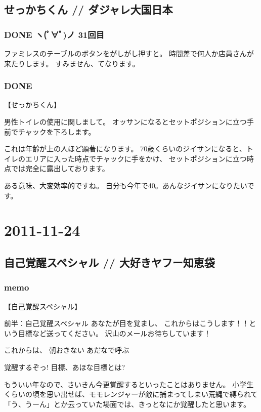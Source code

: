 \documentclass[11pt]{article}
\begin{document}
\subsection{せっかちくん // ダジャレ大国日本}
\label{sec-31_1}
\subsubsection{\textbf{DONE} ヽ(ﾟ∀ﾟ)ノ 31回目}
\label{sec-31_1_1}

ファミレスのテーブルのボタンをがしがし押すと。
時間差で何人か店員さんが来たりします。
すみません、てなります。
\subsubsection{\textbf{DONE}}
\label{sec-31_1_2}

【せっかちくん】

男性トイレの使用に関しまして。
オッサンになるとセットポジションに立つ手前でチャックを下ろします。

これは年齢が上の人ほど顕著になります。
70歳くらいのジイサンになると、トイレのエリアに入った時点でチャックに手をかけ、
セットポジションに立つ時点では完全に露出しております。

ある意味、大変効率的ですね。
自分も今年で40。あんなジイサンになりたいです。
\section{2011-11-24}
\label{sec-32}
\subsection{自己覚醒スペシャル // 大好きヤフー知恵袋}
\label{sec-32_1}
\subsubsection{memo}
\label{sec-32_1_1}

【自己覚醒スペシャル】

前半：自己覚醒スペシャル あなたが目を覚まし、 これからはこうします！！という目標など送ってください。 沢山のメールお待ちしています！

これからは、
朝おきない
あだなで呼ぶ

覚醒するぞっ!
目標、あほな目標とは?

もういい年なので、さいきん今更覚醒するといったことはありません。
小学生くらいの頃を思い出せば、モモレンジャーが敵に捕まってしまい荒縄で縛られて「う、うーん」とか云っていた場面では、きっとなにか覚醒したと思います。
\end{document}
